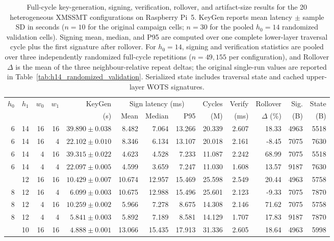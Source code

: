 \begin{table}[t]
\centering
\caption{Full-cycle key-generation, signing, verification, rollover, and artifact-size results for the 20 heterogeneous XMSSMT configurations on Raspberry Pi~5. KeyGen reports mean latency $\pm$ sample SD in seconds ($n=10$ for the original campaign cells; $n=30$ for the pooled $h_0=14$ randomized validation cells). Signing mean, median, and P95 are computed over one complete lower-layer traversal cycle plus the first signature after rollover. For $h_0=14$, signing and verification statistics are pooled over three independently randomized full-cycle repetitions ($n=49{,}155$ per configuration), and Rollover $\Delta$ is the mean of the three neighbour-relative repeat deltas; the original single-run values are reported in Table~\ref{tab:h14_randomized_validation}. Serialized state includes traversal state and cached upper-layer WOTS signatures.}
\label{tab:main_20cell_results}
\scriptsize
\setlength{\tabcolsep}{1.65pt}
\begin{tabular}{@{}rrrrrrrrrrrrr@{}}
\toprule
$h_0$ & $h_1$ & $w_0$ & $w_1$ & KeyGen & \multicolumn{3}{c}{Sign latency (ms)} & Cycles & Verify & Rollover & Sig. & State \\
\cmidrule(lr){6-8}
& & & & (s) & Mean & Median & P95 & (M) & (ms) & $\Delta$ (\%) & (B) & (B) \\
\midrule
6 & 14 & 16 & 16 & $39.890\pm0.038$ & 8.482 & 7.064 & 13.266 & 20.339 & 2.607 & 18.33 & 4963 & 5518 \\
6 & 14 & 16 & 4 & $22.102\pm0.010$ & 8.346 & 6.134 & 13.107 & 20.018 & 2.161 & -8.45 & 7075 & 7630 \\
6 & 14 & 4 & 16 & $39.315\pm0.022$ & 4.623 & 4.528 & 7.233 & 11.087 & 2.242 & 68.99 & 7075 & 5518 \\
6 & 14 & 4 & 4 & $22.097\pm0.005$ & 4.599 & 3.659 & 7.247 & 11.030 & 1.608 & 13.57 & 9187 & 7630 \\
\addlinespace
8 & 12 & 16 & 16 & $10.429\pm0.007$ & 10.674 & 12.957 & 15.469 & 25.598 & 2.549 & 20.44 & 4963 & 5758 \\
8 & 12 & 16 & 4 & $6.099\pm0.003$ & 10.675 & 12.988 & 15.496 & 25.601 & 2.123 & -9.33 & 7075 & 7870 \\
8 & 12 & 4 & 16 & $10.259\pm0.002$ & 5.966 & 7.278 & 8.675 & 14.308 & 2.146 & 71.62 & 7075 & 5758 \\
8 & 12 & 4 & 4 & $5.841\pm0.003$ & 5.892 & 7.189 & 8.581 & 14.129 & 1.707 & 17.83 & 9187 & 7870 \\
\addlinespace
10 & 10 & 16 & 16 & $4.888\pm0.001$ & 13.066 & 15.435 & 17.913 & 31.336 & 2.605 & 18.64 & 4963 & 5998 \\

\end{tabular}
\end{table}
